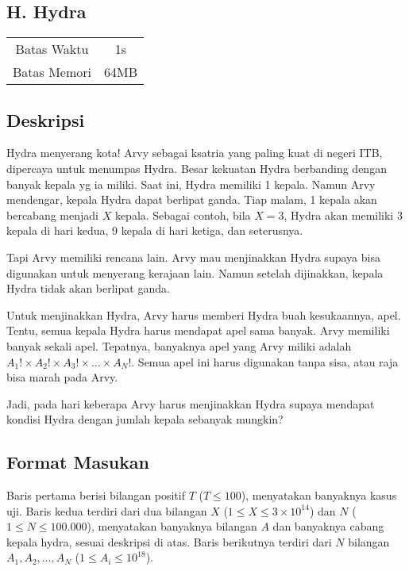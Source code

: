 \documentclass{article}
\begin{document}
\begin{center}
    \section*{H. Hydra} %

    \begin{tabular}{ | c c | }
        \hline
        Batas Waktu  & 1s \\    %
        Batas Memori & 64MB \\  %
        \hline
    \end{tabular}
\end{center}

\subsection*{Deskripsi}

Hydra menyerang kota! Arvy sebagai ksatria yang paling kuat di negeri ITB, dipercaya untuk menumpas Hydra.
Besar kekuatan Hydra berbanding dengan banyak kepala yg ia miliki.
Saat ini, Hydra memiliki 1 kepala. Namun Arvy mendengar, kepala Hydra dapat berlipat ganda.
Tiap malam, 1 kepala akan bercabang menjadi $X$ kepala.
Sebagai contoh, bila $X = 3$, Hydra akan memiliki 3 kepala di hari kedua, 9 kepala di hari ketiga, dan seterusnya.

Tapi Arvy memiliki rencana lain. Arvy mau menjinakkan Hydra supaya bisa digunakan untuk menyerang kerajaan lain.
Namun setelah dijinakkan, kepala Hydra tidak akan berlipat ganda.

Untuk menjinakkan Hydra, Arvy harus memberi Hydra buah kesukaannya, apel.
Tentu, semua kepala Hydra harus mendapat apel sama banyak.
Arvy memiliki banyak sekali apel.
Tepatnya, banyaknya apel yang Arvy miliki adalah $A_1! \times A_2! \times A_3! \times \dots \times A_N!$.
Semua apel ini harus digunakan tanpa sisa, atau raja bisa marah pada Arvy.

Jadi, pada hari keberapa Arvy harus menjinakkan Hydra supaya mendapat kondisi Hydra dengan jumlah kepala sebanyak mungkin?

\subsection*{Format Masukan}
Baris pertama berisi bilangan positif $T$ ($T \leq 100$), menyatakan banyaknya kasus uji.
Baris kedua terdiri dari dua bilangan $X$ ($1 \leq X \leq 3 \times {10}^{14}$) dan $N$ ($1 \leq N \leq 100.000$), menyatakan banyaknya bilangan $A$ dan banyaknya cabang kepala hydra, sesuai deskripsi di atas.
Baris berikutnya terdiri dari $N$ bilangan $A_1, A_2, \dots, A_N$ ($1 \leq A_i \leq {10}^{18}$).
\end{document}
